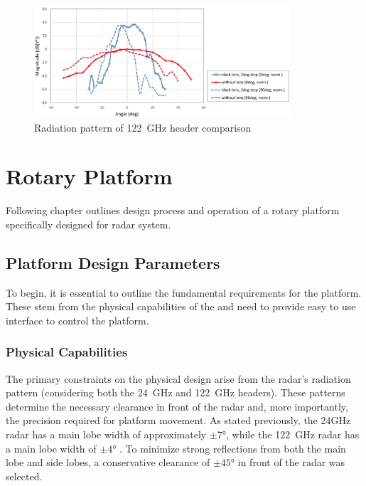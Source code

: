 \begin{figure}[h!]
  \centering
  \includegraphics[width=0.85\textwidth]{../img/sidar122rad.jpg}
  \caption[Radiation pattern of 122~GHz header comparison \cite{sidarTRX122col}]{Radiation pattern of 122~GHz header comparison}
  \label{fig:sidar122rad}
\end{figure}



\chapter{Rotary Platform}

Following chapter outlines design process and operation of a rotary platform specifically designed for \sidar radar system.

\section{Platform Design Parameters}


To begin, it is essential to outline the fundamental requirements for the platform.
These stem from the physical capabilities of the \sidar and need to provide easy to use interface to control the platform.

\subsection{Physical Capabilities}

The primary constraints on the physical design arise from the radar’s radiation pattern (considering both the 24~GHz and 122~GHz headers).
These patterns determine the necessary clearance in front of the radar and, more importantly, the precision required for platform movement.
As stated previously, the 24GHz radar has a main lobe width of approximately $\pm7\text{°}$, while the 122~GHz radar has a main lobe width of $\pm4\text{°}$ \cite{sidarTRX122}.
To minimize strong reflections from both the main lobe and side lobes, a conservative clearance of $\pm45\text{°}$ in front of the radar was selected.

